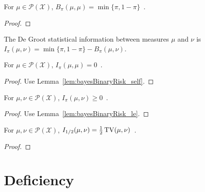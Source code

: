 \begin{lemma}
  \label{lem:bayesBinaryRisk_self}
  For $\mu \in \mathcal P(\mathcal X)$, $B_\pi(\mu, \mu) = \min\{\pi, 1-\pi\}$~.
\end{lemma}

\begin{proof}%
\uses{}
\end{proof}

\begin{definition}
  \label{def:deGrootInfo}
  The De Groot statistical information between measures $\mu$ and $\nu$ is $I_\pi(\mu, \nu) = \min\{\pi, 1 - \pi\} - B_\pi(\mu, \nu)$.
\end{definition}

\begin{lemma}
  \label{lem:deGrootInfo_self}
  For $\mu \in \mathcal P(\mathcal X)$, $I_\pi(\mu, \mu) = 0$~.
\end{lemma}

\begin{proof}%
{}
Use Lemma~\ref{lem:bayesBinaryRisk_self}.
\end{proof}

\begin{lemma}
  \label{lem:deGrootInfo_nonneg}
  For $\mu, \nu \in \mathcal P(\mathcal X)$, $I_\pi(\mu, \nu) \ge 0$~.
\end{lemma}

\begin{proof}%
{}
Use Lemma~\ref{lem:bayesBinaryRisk_le}.
\end{proof}

\begin{lemma}
  \label{lem:deGrootInfo_half}
  For $\mu, \nu \in \mathcal P(\mathcal X)$, $I_{1/2}(\mu, \nu) = \frac{1}{2}\operatorname{TV}(\mu, \nu)$~.
\end{lemma}

\begin{proof}%
\uses{}

\end{proof}

\section{Deficiency}

